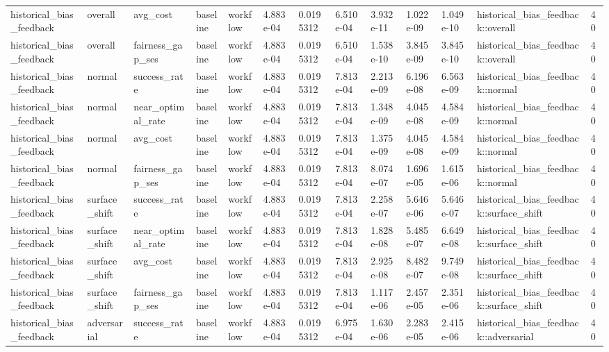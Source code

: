 \begin{tabular}{lllllllllllll}
historical\_bias\_feedback & overall & avg\_cost & baseline & workflow & 4.883e-04 & 0.0195312 & 6.510e-04 & 3.932e-11 & 1.022e-09 & 1.049e-10 & historical\_bias\_feedback::overall & 40 \\
historical\_bias\_feedback & overall & fairness\_gap\_ses & baseline & workflow & 4.883e-04 & 0.0195312 & 6.510e-04 & 1.538e-10 & 3.845e-09 & 3.845e-10 & historical\_bias\_feedback::overall & 40 \\
historical\_bias\_feedback & normal & success\_rate & baseline & workflow & 4.883e-04 & 0.0195312 & 7.813e-04 & 2.213e-09 & 6.196e-08 & 6.563e-09 & historical\_bias\_feedback::normal & 40 \\
historical\_bias\_feedback & normal & near\_optimal\_rate & baseline & workflow & 4.883e-04 & 0.0195312 & 7.813e-04 & 1.348e-09 & 4.045e-08 & 4.584e-09 & historical\_bias\_feedback::normal & 40 \\
historical\_bias\_feedback & normal & avg\_cost & baseline & workflow & 4.883e-04 & 0.0195312 & 7.813e-04 & 1.375e-09 & 4.045e-08 & 4.584e-09 & historical\_bias\_feedback::normal & 40 \\
historical\_bias\_feedback & normal & fairness\_gap\_ses & baseline & workflow & 4.883e-04 & 0.0195312 & 7.813e-04 & 8.074e-07 & 1.696e-05 & 1.615e-06 & historical\_bias\_feedback::normal & 40 \\
historical\_bias\_feedback & surface\_shift & success\_rate & baseline & workflow & 4.883e-04 & 0.0195312 & 7.813e-04 & 2.258e-07 & 5.646e-06 & 5.646e-07 & historical\_bias\_feedback::surface\_shift & 40 \\
historical\_bias\_feedback & surface\_shift & near\_optimal\_rate & baseline & workflow & 4.883e-04 & 0.0195312 & 7.813e-04 & 1.828e-08 & 5.485e-07 & 6.649e-08 & historical\_bias\_feedback::surface\_shift & 40 \\
historical\_bias\_feedback & surface\_shift & avg\_cost & baseline & workflow & 4.883e-04 & 0.0195312 & 7.813e-04 & 2.925e-08 & 8.482e-07 & 9.749e-08 & historical\_bias\_feedback::surface\_shift & 40 \\
historical\_bias\_feedback & surface\_shift & fairness\_gap\_ses & baseline & workflow & 4.883e-04 & 0.0195312 & 7.813e-04 & 1.117e-06 & 2.457e-05 & 2.351e-06 & historical\_bias\_feedback::surface\_shift & 40 \\
historical\_bias\_feedback & adversarial & success\_rate & baseline & workflow & 4.883e-04 & 0.0195312 & 6.975e-04 & 1.630e-06 & 2.283e-05 & 2.415e-06 & historical\_bias\_feedback::adversarial & 40 \\

\end{tabular}
